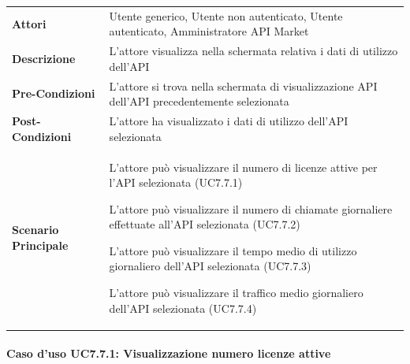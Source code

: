 \begin{minipage}{\linewidth}
	\begin{tabular}{ l | p{11cm}}
		\hline
		\rowcolor{Gray}
		\multicolumn{2}{c}{UC7.7 - Visualizzazione dati di utilizzo API} \\
		\hline
		\textbf{Attori} & Utente generico, Utente non autenticato, Utente autenticato, Amministratore API Market \\
		\textbf{Descrizione} & L'attore visualizza nella schermata relativa i dati di utilizzo dell'API \\
		\textbf{Pre-Condizioni} & L'attore si trova nella schermata di visualizzazione API dell'API precedentemente selezionata \\
		\textbf{Post-Condizioni} & L'attore ha visualizzato i dati di utilizzo dell'API selezionata \\
		\textbf{Scenario Principale} & 
		\begin{enumerate*}[label=(\arabic*.),itemjoin={\newline}]
			\item L'attore può visualizzare il numero di licenze attive per l'API selezionata (UC7.7.1)
			\item L'attore può visualizzare il numero di chiamate giornaliere effettuate all'API selezionata (UC7.7.2)
			\item L'attore può visualizzare il tempo medio di utilizzo giornaliero dell'API selezionata (UC7.7.3)
			\item L'attore può visualizzare il traffico medio giornaliero dell'API selezionata (UC7.7.4)
		\end{enumerate*}\\
	\end{tabular}
\end{minipage}

\paragraph{Caso d'uso UC7.7.1: Visualizzazione numero licenze attive}
\label{UC7_7_1}

